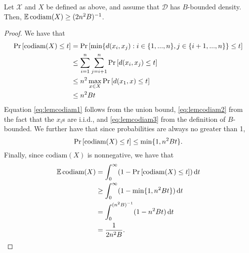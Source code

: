 \documentclass[../main.tex]{subfiles}
\newcommand{\set}[1]{\mathcal {#1}}
\newcommand{\distribution}[1]{\mathcal {#1}}
\newcommand{\dist}[2]{\distf({#1},{#2})}
\newcommand{\distf}{d}
\newcommand{\codiam}[1]{\text{codiam}({#1})}
\begin{document}
\begin{lemma}
    \label{lemma:Ecodiam}
    Let $\set X$ and $X$ be defined as above,
    and assume that $\distribution D$ has $B$-bounded density.
    Then, $\E\codiam{X} \ge (2n^2B)^{-1}$.
\end{lemma}
\begin{proof}
    We have that
    \begin{align}
        \prob{\codiam{X} \le t}
        &=
        \prob{\min \{ \dist{x_i}{x_j} : i\in\{1,...,n\}, j\in\{i+1,...,n\} \} \le t}
        \\ &\le 
        \sum_{i=1}^n\sum_{j=i+1}^n \prob{\dist{x_i}{x_j} \le t}
        \label{eq:lemcodiam1}
        \\ & \le
        n^2 \max_{x\in X} \prob{\dist{x_1}{x} \le t}
        \label{eq:lemcodiam2}
        \\ & \le 
        n^2 B t
        \label{eq:lemcodiam3}
    \end{align}
    Equation \eqref{eq:lemcodiam1} follows from the union bound,
    \eqref{eq:lemcodiam2} from the fact that the $x_i$s are i.i.d.,
    and \eqref{eq:lemcodiam3} from the definition of $B$-bounded.
    We further have that since probabilities are always no greater than 1,
    \begin{equation}
        \prob{\codiam{X}\le t} \le \min\{1,n^2Bt\}
        .
    \end{equation}
    Finally, since $\codiam{X}$ is nonnegative, we have that 
    \begin{align}
        \E \codiam{X}
        &=
        \int_0^\infty (1-\prob{\codiam{X} \le t}) \dd t
        \\ & \ge
        \int_0^\infty (1-\min\{1,n^2 Bt\}) \dd t
        \\ & = 
        \int_0^{(n^2B)^{-1}} (1 - n^2 Bt) \dd t
        \\ & =
        \frac{1}{2n^2B}
        \label{eq:Ecodiamproof}
        .
    \end{align}
\end{proof}

\end{document}
